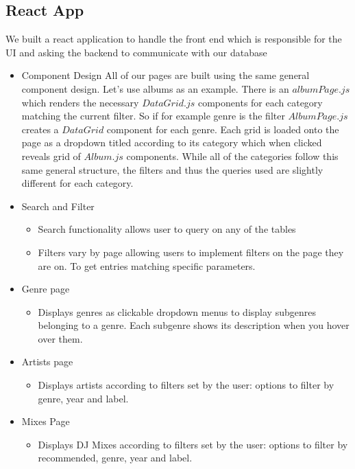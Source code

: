 \documentclass{article}
\begin{document}
    \subsection{React App} 
    We built a react application to handle the front end which is responsible for the UI and asking the backend to communicate with our database
        \begin{itemize}
            \item Component Design
            All of our pages are built using the same general component design. Let's use albums as an example. There is an $albumPage.js$
            which renders the necessary $DataGrid.js$ components for each category matching the current filter. So if for example genre is the filter
            $AlbumPage.js$ creates a $DataGrid$ component for each genre. Each grid is loaded onto the page as a dropdown titled according to its category
            which when clicked reveals grid of $Album.js$ components. While all of the categories follow this same general structure, the filters and thus the queries used are slightly
            different for each category. 
            \item Search and Filter
            \begin{itemize}
                \item Search functionality allows user to query on any of the tables
                \item Filters vary by page allowing users to implement filters on the page they are on. To get entries matching specific parameters.
            \end{itemize}
            \item Genre page
            \begin{itemize}
                \item Displays genres as clickable dropdown menus to display subgenres belonging to a genre. Each subgenre shows its description when you hover over them.
            \end{itemize}
            \item Artists page
            \begin{itemize}
                \item Displays artists according to filters set by the user: options to filter by genre, year and label.
            \end{itemize}
            \item Mixes Page
            \begin{itemize}
                \item Displays DJ Mixes according to filters set by the user: options to filter by recommended, genre, year and label.

\end{itemize}
\end{itemize}
\end{document}
